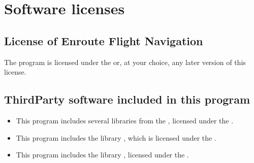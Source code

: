 \documentclass[letterpaper,10pt,english]{sphinxmanual}
\begin{document}
\chapter{Software licenses}
\label{\detokenize{04-appendix/licenses:software-licenses}}\label{\detokenize{04-appendix/licenses::doc}}

\section{License of Enroute Flight Navigation}
\label{\detokenize{04-appendix/licenses:license-of-enroute-flight-navigation}}
\sphinxAtStartPar
The program  is licensed under the  or,
at your choice, any later version of this license.


\section{Third\sphinxhyphen{}Party software included in this program}
\label{\detokenize{04-appendix/licenses:third-party-software-included-in-this-program}}\begin{itemize}
\item {} 
\sphinxAtStartPar
This program includes several libraries from the , licensed under the .

\item {} 
\sphinxAtStartPar
This program includes the library , which is licensed under the
.

\item {} 
\sphinxAtStartPar
This program includes the library , licensed
under the .

\end{itemize}
\end{document}
